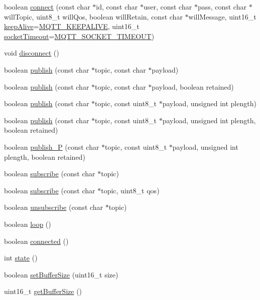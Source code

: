 \begin{DoxyCompactItemize}
\item 
boolean \hyperlink{class_cool_pub_sub_client_a7e5a85731dd25d90a41f6d859e61da77}{connect} (const char $\ast$id, const char $\ast$user, const char $\ast$pass, const char $\ast$will\+Topic, uint8\+\_\+t will\+Qos, boolean will\+Retain, const char $\ast$will\+Message, uint16\+\_\+t \hyperlink{class_cool_pub_sub_client_a653f086eb3a039c08116bb828e35f7c1}{keep\+Alive}=\hyperlink{_cool_pub_sub_client_8h_afb4dd8c75385ab30e659314df7c2c335}{M\+Q\+T\+T\+\_\+\+K\+E\+E\+P\+A\+L\+I\+VE}, uint16\+\_\+t \hyperlink{class_cool_pub_sub_client_a2d7b7c7dda1313ff1492b158c3712630}{socket\+Timeout}=\hyperlink{_cool_pub_sub_client_8h_a092cc564e4d7f03fdab6137e30a7f05b}{M\+Q\+T\+T\+\_\+\+S\+O\+C\+K\+E\+T\+\_\+\+T\+I\+M\+E\+O\+UT})
\item 
void \hyperlink{class_cool_pub_sub_client_a60bd133e45bebc921f6df20f45106490}{disconnect} ()
\item 
boolean \hyperlink{class_cool_pub_sub_client_ab6ad5fa2d3db8f91454027257f225a89}{publish} (const char $\ast$topic, const char $\ast$payload)
\item 
boolean \hyperlink{class_cool_pub_sub_client_a0b01cef98af0b57d8da4df373e196448}{publish} (const char $\ast$topic, const char $\ast$payload, boolean retained)
\item 
boolean \hyperlink{class_cool_pub_sub_client_abf184c0968a6655b68b5fdfbbc0c87d1}{publish} (const char $\ast$topic, const uint8\+\_\+t $\ast$payload, unsigned int plength)
\item 
boolean \hyperlink{class_cool_pub_sub_client_adef968760eb87b70e3fed03e60da76f7}{publish} (const char $\ast$topic, const uint8\+\_\+t $\ast$payload, unsigned int plength, boolean retained)
\item 
boolean \hyperlink{class_cool_pub_sub_client_a55458d47cf01f590e9b6647d5a418ab6}{publish\+\_\+P} (const char $\ast$topic, const uint8\+\_\+t $\ast$payload, unsigned int plength, boolean retained)
\item 
boolean \hyperlink{class_cool_pub_sub_client_ac1ebc9ad874128aefa985d78496d2e8f}{subscribe} (const char $\ast$topic)
\item 
boolean \hyperlink{class_cool_pub_sub_client_aebf684e98588c52a72af1014f7957bee}{subscribe} (const char $\ast$topic, uint8\+\_\+t qos)
\item 
boolean \hyperlink{class_cool_pub_sub_client_a850554280e314d6b5c33c73fd9e809fc}{unsubscribe} (const char $\ast$topic)
\item 
boolean \hyperlink{class_cool_pub_sub_client_afc15900f0fc4886a19394508e61793b8}{loop} ()
\item 
boolean \hyperlink{class_cool_pub_sub_client_a3d5a5da4ddb1e5c1bea64d80c665d148}{connected} ()
\item 
int \hyperlink{class_cool_pub_sub_client_a3245a5afc6d22e61270dcfe392ccb866}{state} ()
\item 
boolean \hyperlink{class_cool_pub_sub_client_a4f83e54f1ba96e32f725d93cdec283b7}{set\+Buffer\+Size} (uint16\+\_\+t size)
\item 
uint16\+\_\+t \hyperlink{class_cool_pub_sub_client_ac3c8bf1daed573d1ffa8b5c1fcb13f98}{get\+Buffer\+Size} ()
\end{DoxyCompactItemize}
